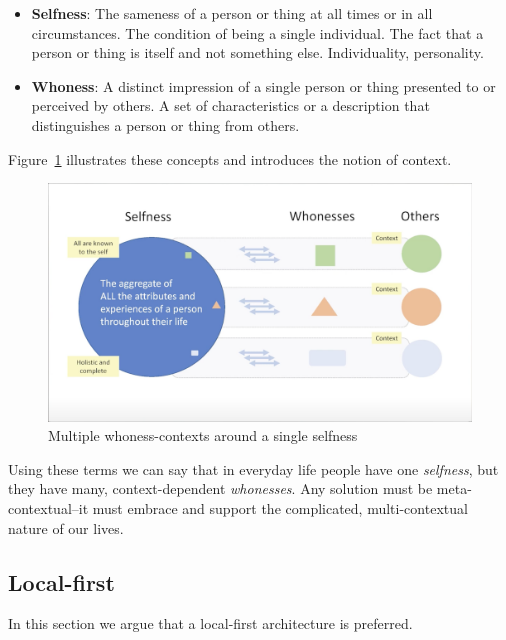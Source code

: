 \documentclass[11pt, oneside]{article}   	%
\begin{document}
\begin{itemize}
\item \textbf{Selfness}: The sameness of a person or thing at all times or in all circumstances. The condition of being a single individual. The fact that a person or thing is itself and not something else. Individuality, personality. 
\item \textbf{Whoness}: A distinct impression of a single person or thing presented to or perceived by others. A set of characteristics or a description that distinguishes a person or thing from others. 
\end{itemize}

Figure~\ref{fig:multiple-contexts} illustrates these concepts and introduces the notion of context.

\begin{figure}[htbp]
\includegraphics[width=\textwidth]{./images/selfness-and-whoness-larger.png}
\caption{Multiple whoness-contexts around a single selfness}
\label{fig:multiple-contexts}
\end{figure}

Using these terms we can say that in everyday life people have one \emph{selfness}, but they have many, context-dependent \emph{whonesses}. Any solution must be meta-contextual--it must embrace and support the complicated, multi-contextual nature of our lives.


\subsection{Local-first}

In this section we argue that a local-first architecture is preferred. 
\end{document}
